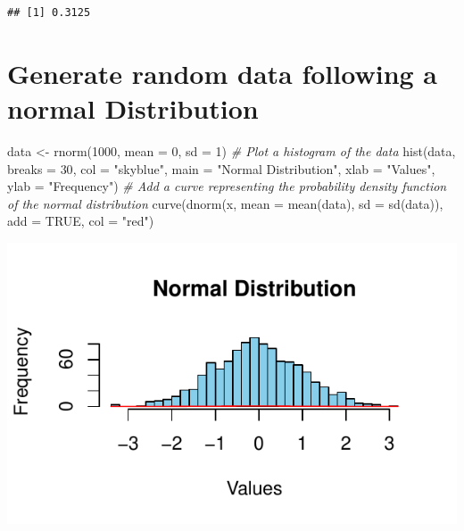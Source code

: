 \documentclass[]{tufte-handout}
\newenvironment{Shaded}{}{}
\newcommand{\AttributeTok}[1]{\textcolor[rgb]{0.49,0.56,0.16}{#1}}
\newcommand{\CommentTok}[1]{\textcolor[rgb]{0.38,0.63,0.69}{\textit{#1}}}
\newcommand{\ConstantTok}[1]{\textcolor[rgb]{0.53,0.00,0.00}{#1}}
\newcommand{\DecValTok}[1]{\textcolor[rgb]{0.25,0.63,0.44}{#1}}
\newcommand{\FunctionTok}[1]{\textcolor[rgb]{0.02,0.16,0.49}{#1}}
\newcommand{\NormalTok}[1]{#1}
\newcommand{\OtherTok}[1]{\textcolor[rgb]{0.00,0.44,0.13}{#1}}
\newcommand{\StringTok}[1]{\textcolor[rgb]{0.25,0.44,0.63}{#1}}
\begin{document}
\begin{verbatim}
## [1] 0.3125
\end{verbatim}

\hypertarget{generate-random-data-following-a-normal-distribution}{%
\section{Generate random data following a normal
Distribution}\label{generate-random-data-following-a-normal-distribution}}

\begin{Shaded}
\begin{Highlighting}[]
\NormalTok{data }\OtherTok{\textless{}{-}} \FunctionTok{rnorm}\NormalTok{(}\DecValTok{1000}\NormalTok{, }\AttributeTok{mean =} \DecValTok{0}\NormalTok{, }\AttributeTok{sd =} \DecValTok{1}\NormalTok{)}
\CommentTok{\# Plot a histogram of the data}
\FunctionTok{hist}\NormalTok{(data, }\AttributeTok{breaks =} \DecValTok{30}\NormalTok{, }\AttributeTok{col =} \StringTok{"skyblue"}\NormalTok{, }\AttributeTok{main =} \StringTok{"Normal Distribution"}\NormalTok{, }\AttributeTok{xlab =} \StringTok{"Values"}\NormalTok{, }\AttributeTok{ylab =} \StringTok{"Frequency"}\NormalTok{)}
\CommentTok{\# Add a curve representing the probability density function of the normal distribution}
\FunctionTok{curve}\NormalTok{(}\FunctionTok{dnorm}\NormalTok{(x, }\AttributeTok{mean =} \FunctionTok{mean}\NormalTok{(data), }\AttributeTok{sd =} \FunctionTok{sd}\NormalTok{(data)), }\AttributeTok{add =} \ConstantTok{TRUE}\NormalTok{, }\AttributeTok{col =} \StringTok{"red"}\NormalTok{)}
\end{Highlighting}
\end{Shaded}

\includegraphics{cripto_update_files/figure-latex/unnamed-chunk-14-1}
\end{document}
